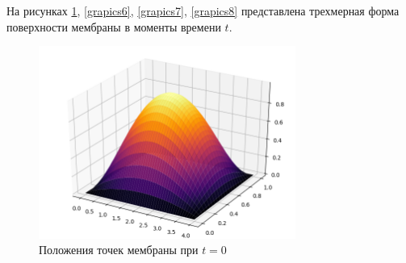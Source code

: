 {{На рисунках \ref{grapics5}, \ref{grapics6}, \ref{grapics7}, \ref{grapics8} представлена трехмерная форма поверхности мембраны в моменты времени $t$.  

\begin{figure}[H]
    \centering                             
	\includegraphics[width=0.75\textwidth,height=\textheight,keepaspectratio]{3d_0.png}                 
	\centering\caption{ Положения точек мембраны при $t=0$}
	\label{grapics5}                           
\end{figure}               

}}
